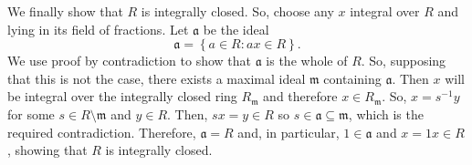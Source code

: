 \documentclass[12pt]{article}
\begin{document}
We finally show that $R$ is integrally closed. So, choose any $x$ integral over $R$ and lying in its field of fractions. Let $\mathfrak{a}$ be the ideal
\begin{equation*}
\mathfrak{a}=\left\{a\in R:ax\in R\right\}.
\end{equation*}
We use proof by contradiction to show that $\mathfrak{a}$ is the whole of $R$. So, supposing that this is not the case, there exists a maximal ideal $\mathfrak{m}$ containing $\mathfrak{a}$. Then $x$ will be integral over the integrally closed ring $R_\mathfrak{m}$ and therefore $x\in R_\mathfrak{m}$. So, $x=s^{-1}y$ for some $s\in R\setminus\mathfrak{m}$ and $y\in R$. Then, $sx=y\in R$ so $s\in\mathfrak{a}\subseteq\mathfrak{m}$, which is the required contradiction. Therefore, $\mathfrak{a}=R$ and, in particular, $1\in\mathfrak{a}$ and $x=1x\in R$, showing that $R$ is integrally closed.

\end{document}
